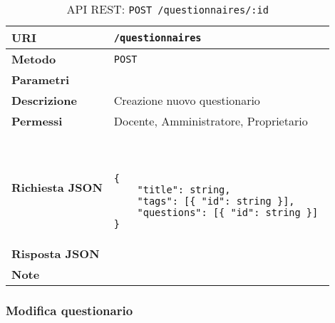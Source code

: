         \begin{table}[H]
            \begin{center}
                \begin{tabular}{p{} p{}}
                    \toprule
                    \textbf{URI} & \texttt{/questionnaires} \\ \midrule
                    \textbf{Metodo} & \texttt{POST} \\ \midrule
                    \textbf{Parametri} & \\ \midrule
                    \textbf{Descrizione} & Creazione nuovo questionario \\ \midrule
                    \textbf{Permessi} & Docente, Amministratore, Proprietario  \\ \midrule
                    \textbf{Richiesta JSON} & \
                        \begin{lstlisting}[basicstyle={\ttfamily}]
{
    "title": string,
    "tags": [{ "id": string }],
    "questions": [{ "id": string }] 
}
                        \end{lstlisting}
                        \\ \midrule
                    \textbf{Risposta JSON} & \\ \midrule
                    \textbf{Note} & \\
                    \bottomrule
                \end{tabular}
                \caption{API REST: \texttt{POST /questionnaires/:id}}
            \end{center}
        \end{table}

    \subsubsection{Modifica questionario}


